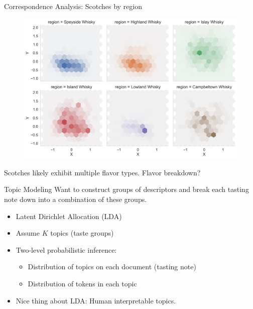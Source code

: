 \documentclass{beamer}
\begin{document}
	\begin{frame}{Correspondence Analysis: Scotches by region}
		\begin{figure}[H]
		\begin{center}
			\includegraphics[scale = 0.35]{CA_scotch_hexdistbyregion}
		\end{center}
	\end{figure}
Scotches likely exhibit multiple flavor types. Flavor breakdown?
\end{frame}
\begin{frame}{Topic Modeling}
	Want to construct groups of descriptors and break each tasting note down into a combination of these groups.
\begin{itemize}	
	\item Latent Dirichlet Allocation (LDA)
	\item Assume $K$ topics (taste groups)
	\item Two-level probabilistic inference: 
	\begin{itemize}
		\item Distribution of topics on each document (tasting note)
		\item Distribution of tokens in each topic
	\end{itemize}
	\item Nice thing about LDA: Human interpretable topics.
\end{itemize}
	
\end{frame}
\end{document}
